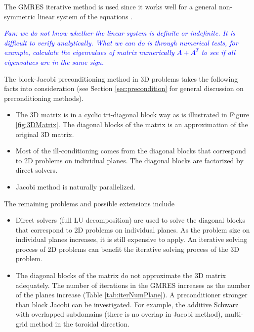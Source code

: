 \documentclass[11pt]{article}  %
\begin{document}
The GMRES iterative method is used since it works well for a general non-symmetric  linear system of the equations \cite{saad2003iterative}. 

\textit{ \textcolor{blue}{Fan: we do not know whether the linear system is definite or indefinite. It is difficult to verify analytically.  What we can do is through numerical tests, for example, calculate the eigenvalues of matrix numerically $A+A^{T}$ to see if all eigenvalues are in the same sign. }}
 
The  block-Jacobi preconditioning  method  in 3D problems takes the following facts into consideration (see Section \ref{sec:precondition} for general discussion on preconditioning methods).
\begin{itemize}
\item The 3D matrix is in a cyclic tri-diagonal block way as is illustrated in Figure \ref{fig:3DMatrix}. The diagonal blocks of the matrix is an approximation of the original 3D matrix. 
\item Most of the  ill-conditioning comes from the diagonal blocks that correspond to 2D problems on individual planes. The diagonal blocks are factorized by direct solvers.
\item Jacobi method is naturally  parallelized.
 \end{itemize} 
 

The remaining problems and possible extensions include
\begin{itemize}
\item Direct solvers (full LU decomposition) are used to solve the diagonal blocks that correspond to 2D problems on individual planes. As the problem size on individual planes increases, it is still expensive to apply. An iterative solving process of 2D problems can benefit the iterative solving process of the 3D problem.
\item The diagonal blocks of the matrix do not approximate the 3D matrix adequately. The number of iterations in the GMRES increases as the number of the planes increase (Table \ref{tab:iterNumPlane}). A preconditioner  stronger than block Jacobi can be investigated. For example, the additive Schwarz with overlapped subdomains (there is no overlap in Jacobi method), multi-grid method in the toroidal direction. 
\end{itemize}
\end{document}
